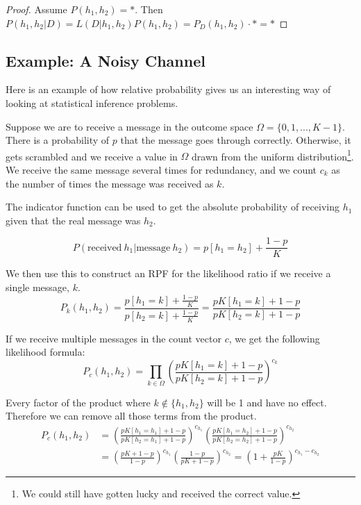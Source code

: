 \documentclass[twoside]{article}
\theoremstyle{plain}%
\theoremstyle{definition}
\theoremstyle{remark}
\begin{document}
\begin{proof}
Assume \(P(h_1, h_2) = \ast\). Then \(P(h_1, h_2|D) = L(D|h_1, h_2) P(h_1, h_2) = P_D(h_1, h_2) \cdot \ast = \ast\)
\end{proof}

\subsection{Example: A Noisy Channel}

Here is an example of how relative probability gives us an interesting way of looking at statistical inference problems.

Suppose we are to receive a message in the outcome space \(\Omega = \{0, 1, ..., K-1\}\). There is a probability of \(p\) that the message goes through correctly. Otherwise, it gets scrambled and we receive a value in \(\Omega\) drawn from the uniform distribution\footnote{We could still have gotten lucky and received the correct value.}. We receive the same message several times for redundancy, and we count \(c_k\) as the number of times the message was received as \(k\).

The indicator function can be used to get the absolute probability of receiving \(h_1\) given that the real message was \(h_2\).

\[P(\text{received}\: h_1 | \text{message}\: h_2) = p[h_1 = h_2] + \frac{1-p}{K}\]
 
We then use this to construct an RPF for the likelihood ratio if we receive a single message, \(k\).
\[P_k(h_1, h_2) = \frac{p[h_1 = k] + \frac{1-p}{K}}{p[h_2 = k] + \frac{1-p}{K}} = \frac{pK[h_1 = k] + 1-p}{pK[h_2 = k] + 1-p}\]

If we receive multiple messages in the count vector \(c\), we get the following likelihood formula:
\[P_c(h_1, h_2) = \prod_{k \in \Omega}\left(\frac{pK[h_1 = k] + 1-p}{pK[h_2 = k] + 1-p}\right)^{c_k}\]

Every factor of the product where \(k \notin \{h_1, h_2\}\) will be 1 and have no effect. Therefore we can remove all those terms from the product.
\begin{equation}
\begin{aligned}
P_c(h_1, h_2) &= \left(\frac{pK[h_1 = h_1] + 1-p}{pK[h_2 = h_1] + 1-p}\right)^{c_{h_1}} \left(\frac{pK[h_1 = h_2] + 1-p}{pK[h_2 = h_2] + 1-p}\right)^{c_{h_2}} \\
& = \left(\frac{pK + 1-p}{1-p}\right)^{c_{h_1}} \left(\frac{1-p}{pK + 1-p}\right)^{c_{h_2}} = \left(1 + \frac{pK}{1-p}\right)^{c_{h_1} - c_{h_2}}
\end{aligned}
\end{equation}
\end{document}
